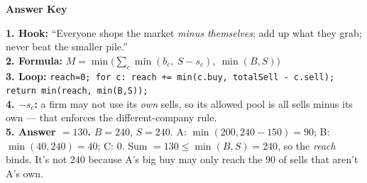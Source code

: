 \documentclass[10pt]{article}
\newcommand{\code}[1]{\texttt{#1}}
\begin{document}
\clearpage

\begin{center}{\LARGE\bfseries\color{NavyBlue} Answer Key}\end{center}
\vspace{1mm}

\begin{tcolorbox}[colback=Soft,colframe=Accent,title={\bfseries Drill A answers},fonttitle=\bfseries\color{white},coltitle=white,colbacktitle=Accent]
\textbf{1. Hook:} ``Everyone shops the market \emph{minus themselves}; add up what they grab; never beat the smaller pile.''\\[3pt]
\textbf{2. Formula:} $\displaystyle M=\min\!\Big(\sum_c\min(b_c,\ S-s_c),\ \min(B,S)\Big)$\\[3pt]
\textbf{3. Loop:} \code{reach=0; for c: reach += min(c.buy, totalSell - c.sell); return min(reach, min(B,S));}\\[3pt]
\textbf{4. $-s_c$:} a firm may not use its \emph{own} sells, so its allowed pool is all sells minus its own --- that enforces the different-company rule.\\[3pt]
\textbf{5. Answer $=130$.} $B{=}240$, $S{=}240$. A: $\min(200,240{-}150){=}90$; B: $\min(40,240){=}40$; C: $0$. Sum $=130 \le \min(B,S){=}240$, so the \emph{reach} binds. It's not $240$ because A's big buy may only reach the $90$ of sells that aren't A's own.
\end{tcolorbox}
\end{document}
